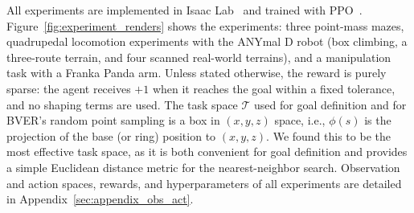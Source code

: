 All experiments are implemented in Isaac Lab~\citep{nvidia2025isaaclabgpuacceleratedsimulation} and trained with PPO~\citep{schulman2017proximal}. Figure~\ref{fig:experiment_renders} shows the experiments: three point-mass mazes, quadrupedal locomotion experiments with the ANYmal D robot (box climbing, a three-route terrain, and four scanned real-world terrains), and a manipulation task with a Franka Panda arm. Unless stated otherwise, the reward is purely sparse: the agent receives $+1$ when it reaches the goal within a fixed tolerance, and no shaping terms are used. The task space $\mathcal{T}$ used for goal definition and for BVER's random point sampling is a box in $(x,y,z)$ space, i.e., $\phi(s)$ is the projection of the base (or ring) position to $(x,y,z)$. We found this to be the most effective task space, as it is both convenient for goal definition and provides a simple Euclidean distance metric for the nearest-neighbor search. Observation and action spaces, rewards, and hyperparameters of all experiments are detailed in Appendix~\ref{sec:appendix_obs_act}.
